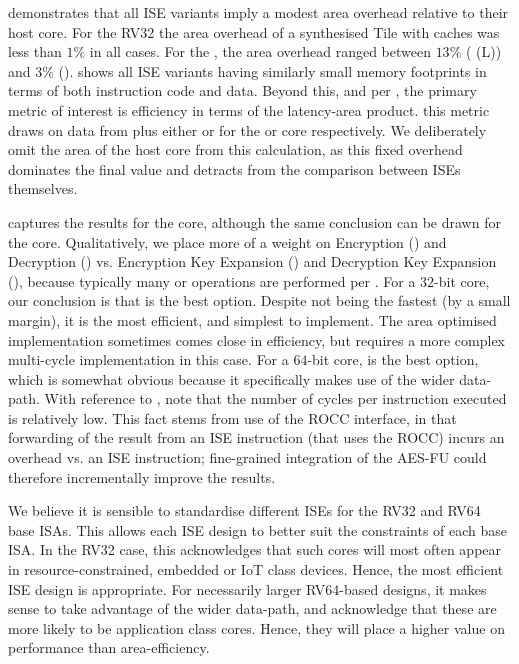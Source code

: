 
demonstrates that all ISE variants
imply a modest area overhead relative to their host core.
For the RV32  the area overhead of a synthesised  Tile with
caches was less than $1\%$ in all cases.
For the , the area overhead ranged between
$13\%$ ( (L))
and
$3\%$ ().
shows all ISE variants
having similarly small memory footprints in terms of both instruction code and
data.
Beyond this, and per 
,
the primary metric of interest is efficiency in terms of
the latency-area product.
this metric draws on data from
plus either
or
for the  or  core respectively.
We deliberately omit the area of the host core from this calculation, as this
fixed overhead dominates the final value and detracts from the comparison
between ISEs themselves.

captures the results for the  core, although the same conclusion can 
be drawn for the  core.  Qualitatively, we place more of a weight on 
Encryption ()
and 
Decryption ()
vs.
Encryption Key Expansion ()
and 
Decryption Key Expansion (),
because
typically many  or  operations are performed per
.
For a $32$-bit core, our conclusion is that
is the best option.
Despite not being the fastest (by a small margin), it is the most efficient,
and simplest to implement.
The area optimised  implementation sometimes comes close in
efficiency, but requires a more complex multi-cycle implementation
in this case.
For a $64$-bit core,
is the best option, which is somewhat obvious because it specifically makes
use of the wider data-path.
With reference to
, 
note that the number of cycles per instruction executed is relatively low.
This fact stems from use of the ROCC interface, in that forwarding of the 
result from an ISE instruction (that uses the ROCC) incurs an overhead vs. 
an ISE instruction; fine-grained integration of the AES-FU could therefore
incrementally improve the results.

We believe it is sensible to standardise different ISEs for the
RV32 and RV64 base ISAs.
This allows each ISE design to better suit the constraints of each
base ISA.
In the RV32 case, this acknowledges that such cores will most often
appear in resource-constrained, embedded or IoT class devices.
Hence, the most efficient ISE design is appropriate.
For necessarily larger RV64-based designs, it makes sense to take advantage
of the wider data-path, and acknowledge that these are more likely to
be application class cores. Hence, they will place a higher value
on performance than area-efficiency.

